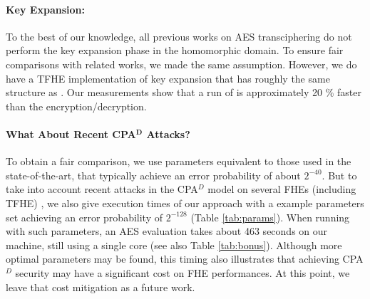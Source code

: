 


\paragraph{Key Expansion:} To the best of our knowledge, all previous works on \gls{AES} transciphering do not perform the key expansion phase in the homomorphic domain. To ensure fair comparisons with related works, we made the same assumption. However, we do have a \gls{TFHE} implementation of key expansion that has roughly the same structure as \hippo. Our measurements show that a run of \KeyExpansion is approximately 20 \% faster than the encryption/decryption. 



\paragraph{What About Recent CPA$^\mathbf{D}$ Attacks?}
To obtain a fair comparison, we use parameters equivalent to those used in the state-of-the-art, that typically achieve an error probability of about $2^{-40}$. But to take into account recent attacks in the CPA$^D$ model \cite{EC:LiMic21} on several FHEs (including \gls{TFHE}) \cite{C:CSBB24, CCS:CCPSS24}, we also give execution times of our approach with a example parameters set achieving an error probability of $2^{-128}$ (Table \ref{tab:params}). When running with such parameters, an \gls{AES} evaluation takes about 463 seconds on our machine, still using a single core (see also Table \ref{tab:bonus}). Although more optimal parameters may be found, this timing also illustrates that achieving CPA$^{D}$ security may have a significant cost on \gls{FHE} performances. At this point, we leave that cost mitigation as a future work.

